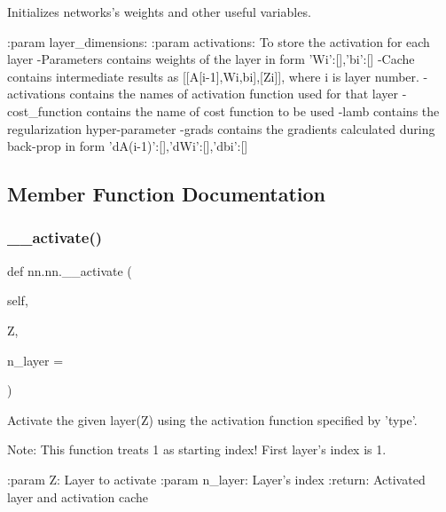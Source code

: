 \begin{DoxyVerb}Initializes networks's weights and other useful variables.

:param layer_dimensions:
:param activations: To store the activation for each layer
-Parameters contains weights of the layer in form {'Wi':[],'bi':[]}
-Cache contains intermediate results as [[A[i-1],Wi,bi],[Zi]], where i
 is layer number.
-activations contains the names of activation function used for that layer
-cost_function  contains the name of cost function to be used
-lamb contains the regularization hyper-parameter
-grads contains the gradients calculated during back-prop in form {'dA(i-1)':[],'dWi':[],'dbi':[]}
\end{DoxyVerb}
 

\subsection{Member Function Documentation}
\mbox{\label{classnn_1_1nn_a1cefed6bf4fd61d437e68c901a15fda2}} 
\subsubsection{\texorpdfstring{\+\_\+\+\_\+activate()}{\_\_activate()}}
{\footnotesize\ttfamily def nn.\+nn.\+\_\+\+\_\+activate (\begin{DoxyParamCaption}\item[{}]{self,  }\item[{}]{Z,  }\item[{}]{n\+\_\+layer = {} }\end{DoxyParamCaption})\hspace{0.3cm}{\ttfamily [private]}}

\begin{DoxyVerb}Activate the given layer(Z) using the activation function specified by
'type'.

Note: This function treats 1 as starting index!
      First layer's index is 1.

:param Z: Layer to activate
:param n_layer: Layer's index
:return: Activated layer and activation cache
\end{DoxyVerb}
 \mbox{\label{classnn_1_1nn_a78173fb77f846a71e27f097b29e701f8}} 
